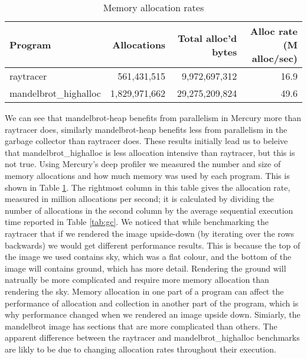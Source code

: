\begin{table}
\begin{center}
\begin{tabular}{l|rr|r}
Program     & Allocations   & Total alloc'd bytes & Alloc rate (M alloc/sec) \\
\hline
raytracer   &   561,431,515 &       9,972,697,312 & 16.9 \\
mandelbrot\_highalloc
            & 1,829,971,662 &      29,275,209,824 & 49.6 \\
\end{tabular}
\end{center}
\caption{Memory allocation rates}
\label{tab:mem_alloc_rate}
\end{table}

We can see that mandelbrot-heap benefits from parallelism in Mercury
more than raytracer does,
similarly mandelbrot-heap benefits less from parallelism in the garbage
collector than raytracer does.
These results initially lead us to beleive that
mandelbrot\_highalloc is less allocation intensive
than raytracer,
but this is not true.
Using Mercury's deep profiler we measured the number and size of memory
allocations and how much memory was used by each program.
This is shown in Table \ref{tab:mem_alloc_rate}.
The rightmost column in this table gives the allocation rate,
measured in million allocations per second;
it is calculated by dividing the number of allocations in the second column
by the average sequential execution time reported in Table \ref{tab:gc}.
We noticed that while benchmarking the raytracer that if we rendered the
image upside-down (by iterating over the rows backwards)
we would get different performance results.
This is because the top of the image we used contains sky,
which was a flat colour,
and the bottom of the image will contains ground,
which has more detail.
Rendering the ground will natrually be more complicated and require more
memory allocation than rendering the sky.
Memory allocation in one part of a program can affect the performance of
allocation and collection in another part of the program,
which is why performance changed when we rendered an image upside down.
Simiarly,
the mandelbrot image has sections that are more complicated than others.
The apparent difference between the raytracer and mandelbrot\_highalloc
benchmarks are likly to be due to changing allocation rates throughout their
execution.



